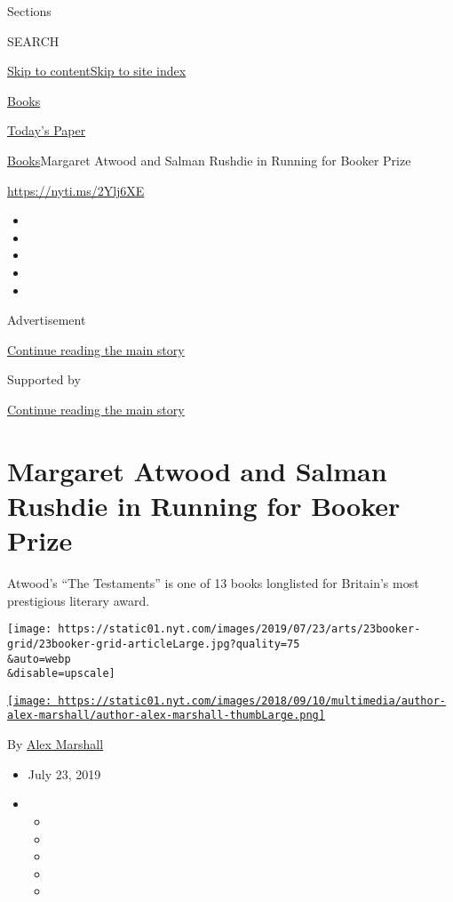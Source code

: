 Sections

SEARCH

\protect\hyperlink{site-content}{Skip to
content}\protect\hyperlink{site-index}{Skip to site index}

\href{https://www.nytimes.com/section/books}{Books}

\href{https://myaccount.nytimes.com/auth/login?response_type=cookie\&client_id=vi}{}

\href{https://www.nytimes.com/section/todayspaper}{Today's Paper}

\href{/section/books}{Books}\textbar{}Margaret Atwood and Salman Rushdie
in Running for Booker Prize

\url{https://nyti.ms/2Ylj6XE}

\begin{itemize}
\item
\item
\item
\item
\item
\end{itemize}

Advertisement

\protect\hyperlink{after-top}{Continue reading the main story}

Supported by

\protect\hyperlink{after-sponsor}{Continue reading the main story}

\hypertarget{margaret-atwood-and-salman-rushdie-in-running-for-booker-prize}{%
\section{Margaret Atwood and Salman Rushdie in Running for Booker
Prize}\label{margaret-atwood-and-salman-rushdie-in-running-for-booker-prize}}

Atwood's ``The Testaments'' is one of 13 books longlisted for Britain's
most prestigious literary award.

\texttt{[image: https://static01.nyt.com/images/2019/07/23/arts/23booker-grid/23booker-grid-articleLarge.jpg?quality=75\\\&auto=webp\\\&disable=upscale]}

\href{https://www.nytimes.com/by/alex-marshall}{\texttt{[image: https://static01.nyt.com/images/2018/09/10/multimedia/author-alex-marshall/author-alex-marshall-thumbLarge.png]}}

By \href{https://www.nytimes.com/by/alex-marshall}{Alex Marshall}

\begin{itemize}
\item
  July 23, 2019
\item
  \begin{itemize}
  \item
  \item
  \item
  \item
  \item
  \end{itemize}
\end{itemize}

